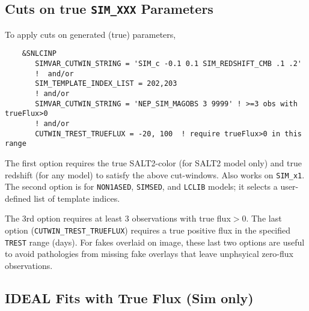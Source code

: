 \documentclass[12pt]{article}
\begin{document}
\subsection{Cuts on true {\tt SIM\_XXX} Parameters}
\label{subsec:SIMVAR_CUTS}

To apply cuts on generated (true) parameters,
\begin{verbatim}
    &SNLCINP
       SIMVAR_CUTWIN_STRING = 'SIM_c -0.1 0.1 SIM_REDSHIFT_CMB .1 .2'
       !  and/or
       SIM_TEMPLATE_INDEX_LIST = 202,203
       ! and/or
       SIMVAR_CUTWIN_STRING = 'NEP_SIM_MAGOBS 3 9999' ! >=3 obs with trueFlux>0
       ! and/or
       CUTWIN_TREST_TRUEFLUX = -20, 100  ! require trueFlux>0 in this range

\end{verbatim}
%
The first option requires the true SALT2-color (for SALT2 model only)
and true redshift (for any model) to satisfy
the above cut-windows.  Also works on {\tt SIM\_x1}.
The second option is for {\tt NON1ASED}, {\tt SIMSED}, and {\tt LCLIB}
models; it selects a user-defined list of template indices.

The 3rd option requires at least 3 observations with true flux$>0$.
The last option ({\tt CUTWIN\_TREST\_TRUEFLUX}) requires
a true positive flux in the specified {\tt TREST} range (days).
For fakes overlaid on image,  these last two options are useful 
to avoid pathologies from missing fake overlays that leave 
unphsyical zero-flux observations.


\clearpage
\subsection{IDEAL Fits with True Flux (Sim only) }
\label{subsec:IDEAL}

\newcommand{\SigInt}{\Sigma_{\rm int}}
\end{document}
